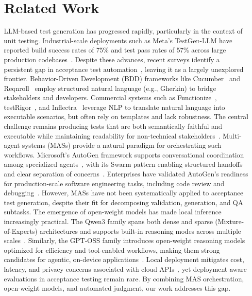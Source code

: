 \documentclass[runningheads]{llncs}
\begin{document}
\section{Related Work}
LLM-based test generation has progressed rapidly, particularly in the context of unit testing. Industrial-scale deployments such as Meta's TestGen-LLM have reported build success rates of 75\% and test pass rates of 57\% across large production codebases~\cite{alshahwan2024automated}. Despite these advances, recent surveys identify a persistent gap in acceptance test automation~\cite{wang2024effectiveness}, leaving it as a largely unexplored frontier.
Behavior-Driven Development (BDD) frameworks like Cucumber~\cite{cucumber2025} and Reqnroll~\cite{reqnroll2025} employ structured natural language (e.g., Gherkin) to bridge stakeholders and developers. Commercial systems such as Functionize~\cite{functionize}, testRigor~\cite{testrigor}, and Inflectra~\cite{inflectra} leverage NLP to translate natural language into executable scenarios, but often rely on templates and lack robustness. The central challenge remains producing tests that are both semantically faithful and executable while maintaining readability for non-technical stakeholders~\cite{karpurapu2024comprehensive}.
Multi-agent systems (MASs) provide a natural paradigm for orchestrating such workflows. Microsoft's AutoGen framework supports conversational coordination among specialized agents~\cite{wu2023autogen}, with its Swarm pattern enabling structured handoffs and clear separation of concerns~\cite{autogen_swarm_docs}. Enterprises have validated AutoGen's readiness for production-scale software engineering tasks, including code review and debugging~\cite{dibia2024autogen}. However, MASs have not been systematically applied to acceptance test generation, despite their fit for decomposing validation, generation, and QA subtasks.
The emergence of open-weight models has made local inference increasingly practical. The Qwen3 family spans both dense and sparse (Mixture-of-Experts) architectures and supports built-in reasoning modes across multiple scales~\cite{yang2025qwen3}. Similarly, the GPT-OSS family introduces open-weight reasoning models optimized for efficiency and tool-enabled workflows, making them strong candidates for agentic, on-device applications~\cite{openai2025gptoss}. Local deployment mitigates cost, latency, and privacy concerns associated with cloud APIs~\cite{huang2025llms}, yet deployment-aware evaluations in acceptance testing remain rare. By combining MAS orchestration, open-weight models, and automated judgment, our work addresses this gap.
\end{document}
